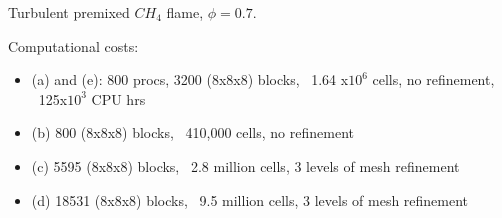 \documentclass{beamer}
\begin{document}
\begin{frame}
\begin{minipage}[t][1\textheight]{1\textwidth}
\begin{exampleblock}{Turbulent premixed $CH_4$ flame, $\phi=0.7$. }
\begin{figure}
\end{figure}

Computational costs:
\begin{itemize}
\tiny
\item (a) and (e): 800 procs, 3200 (8x8x8) blocks, ~1.64 x$10^6$ cells, no refinement, ~125x$10^3$ CPU hrs 
\item (b) 800 (8x8x8) blocks, ~410,000 cells,  no refinement
\item (c) 5595 (8x8x8) blocks, ~2.8 million cells, 3 levels of mesh refinement
\item (d) 18531 (8x8x8) blocks, ~9.5 million cells, 3 levels of mesh refinement
\end{itemize}

\end{exampleblock}
\end{minipage}


\end{frame}

\end{document}

